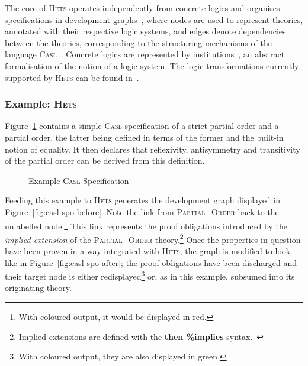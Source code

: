 \documentclass[11pt]{article}
\newcommand{\Casl}{\textsc{Casl}}
\newcommand{\Hets}{\textsc{Hets}}
\begin{document}
The core of \Hets{} operates independently from concrete logics and organises specifications in development graphs~\cite{Mossakowski:2006a}, where nodes are used to represent theories, annotated with their respective logic systems, and edges denote dependencies between the theories, corresponding to the structuring mechanisms of the language \Casl{}~\cite{Astesiano:2002}. Concrete logics are represented by institutions~\cite{Mossakowski:2005a}, an abstract formalisation of the notion of a logic system. The logic transformations currently supported by \Hets{} can be found in~\cite{Mossakowski:2006b}.


\subsubsection{Example: \Hets{}}
\label{sub:introduction_hets_example}

Figure~\ref{ex:casl-spo} contains a simple \Casl{} specification of a strict partial order and a partial order, the latter being defined in terms of the former and the built-in notion of equality. It then declares that reflexivity, antisymmetry  and transitivity of the partial order can be derived from this definition.

\begin{figure}
  
  \caption{Example \Casl{} Specification}\label{ex:casl-spo}
\end{figure}

Feeding this example to \Hets{} generates the development graph displayed in Figure~\ref{fig:casl-spo-before}. Note the link from \textsc{Partial\_Order} back to the unlabelled node.\footnote{With coloured output, it would be displayed in red.} This link represents the proof obligations introduced by the \emph{implied extension} of the \textsc{Partial\_Order} theory.\footnote{Implied extensions are defined with the \textbf{then \%implies} syntax.~\cite{Mosses:2004}} Once the properties in question have been proven in a way integrated with \Hets{}, the graph is modified to look like in Figure~\ref{fig:casl-spo-after}; the proof obligations have been discharged and their target node is either redisplayed\footnote{With coloured output, they are also displayed in green.} or, as in this example, subsumed into its originating theory.
\end{document}

